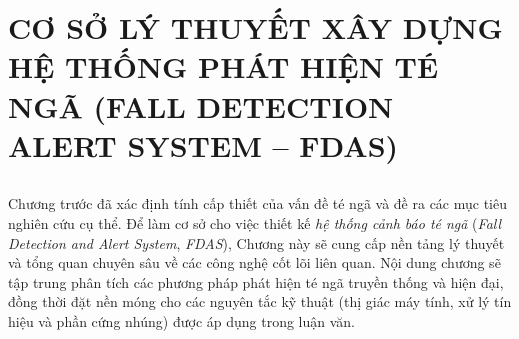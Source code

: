 
\chapter[ CƠ SỞ LÝ THUYẾT XÂY DỰNG HỆ THỐNG FDAS ]%
        { CƠ SỞ LÝ THUYẾT XÂY DỰNG HỆ THỐNG PHÁT HIỆN TÉ NGÃ (FALL DETECTION ALERT SYSTEM – FDAS) }
\label{chap:theory}
\label{chap:theoretical_basis}

\section*{} %

Chương trước đã xác định tính cấp thiết của vấn đề té ngã và đề ra các mục tiêu nghiên cứu cụ thể.  
Để làm cơ sở cho việc thiết kế \emph{hệ thống cảnh báo té ngã} (\emph{Fall Detection and Alert System}, \emph{FDAS}), Chương này sẽ cung cấp nền tảng lý thuyết và tổng quan chuyên sâu về các công nghệ cốt lõi liên quan.  
Nội dung chương sẽ tập trung phân tích các phương pháp phát hiện té ngã truyền thống và hiện đại, đồng thời đặt nền móng cho các nguyên tắc kỹ thuật (thị giác máy tính, xử lý tín hiệu và phần cứng nhúng) được áp dụng trong luận văn.






